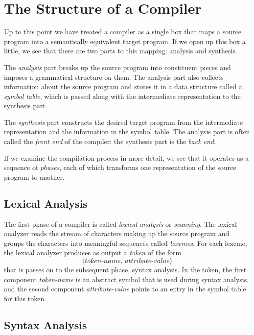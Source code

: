 \documentclass[a4paper,twoside]{book}
\begin{document}
\section{The Structure of a Compiler}

Up to this point we have treated a compiler as a single box that maps a source program into a semantically equivalent target program. If we open up this box a little, we see that there are two parts to this mapping: analysis and synthesis.

The \textit{analysis} part breaks up the source program into constituent pieces and imposes a grammatical structure on them. The analysis part also collects information about the source program and stores it in a data structure called a \textit{symbol table}, which is passed along with the intermediate representation to the synthesis part.

The \textit{synthesis} part constructs the desired target program from the intermediate representation and the information in the symbol table. The analysis part is often called the \textit{front end} of the compiler; the synthesis part is the \textit{back end}.

If we examine the compilation process in more detail, we see that it operates as a sequence of \textit{phases}, each of which transforms one representation of the source program to another.

\subsection{Lexical Analysis}

The first phase of a compiler is called \textit{lexical analysis} or \textit{scanning}. The lexical analyzer reads the stream of characters making up the source program and groups the characters into meaningful sequences called \textit{lexemes}. For each lexeme, the lexical analyzer produces as output a \textit{token} of the form $$\langle\textit{token-name, attribute-value}\rangle$$ that is passes on to the subsequent phase, syntax analysis. In the token, the first component \textit{token-name} is an abstract symbol that is used during syntax analysis, and the second component \textit{attribute-value} points to an entry in the symbol table for this token.

\subsection{Syntax Analysis}
\end{document}
